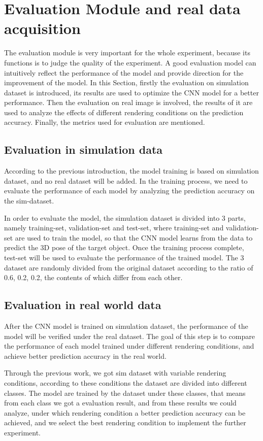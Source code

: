 \section{Evaluation Module and real data acquisition}
The evaluation module is very important for the whole experiment, because its functions is to judge the quality of the experiment. A good evaluation model can intuitively reflect the performance of the model and provide direction for the improvement of the model. In this Section, firstly the evaluation on simulation dataset is introduced, its results are used to optimize the CNN model for a better performance. Then the evaluation on real image is involved, the results of it are used to analyze the effects of different rendering conditions on the prediction accuracy. Finally, the metrics used for evaluation are mentioned.

\subsection{Evaluation in simulation data}
According to the previous introduction, the model training is based on simulation dataset, and no real dataset will be added. In the training process, we need to evaluate the performance of each model by analyzing the prediction accuracy on the sim-dataset. 

In order to evaluate the model, the simulation dataset is divided into 3 parts, namely training-set, validation-set and test-set, where training-set and validation-set are used to train the model, so that the CNN model learns from the data to predict the 3D pose of the target object. Once the training process complete, test-set will be used to evaluate the performance of the trained model. The 3 dataset are randomly divided from the original dataset according to the ratio of 0.6, 0.2, 0.2, the contents of which differ from each other.

 
\subsection{Evaluation in real world data}
After the CNN model is trained on simulation dataset, the performance of the model will be verified under the real dataset. The goal of this step is to compare the performance of each model trained under different rendering conditions, and achieve better prediction accuracy in the real world.

Through the previous work, we got sim dataset with variable rendering conditions, according to these conditions the dataset are divided into different classes. The model are trained by the dataset under these classes, that means from each class we got a evaluation result, and from these results we could analyze, under which rendering condition a better prediction accuracy can be achieved, and we select the best rendering condition to implement the further experiment. 


